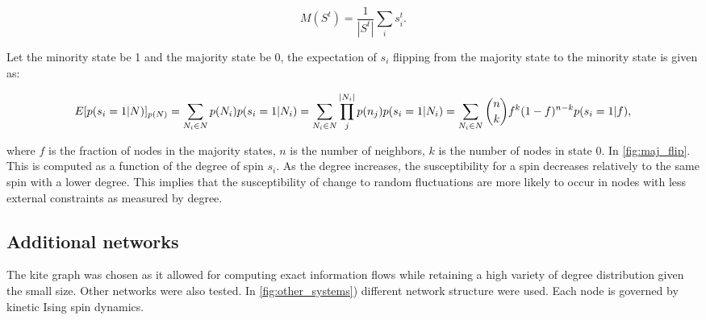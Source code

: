 \documentclass[a4paper, 11pt, twocolumn]{article}
\begin{document}
\[M(S^t) = \frac{1}{|S^t|} \sum_i s_i^t.\]

Let the minority state be 1 and the majority state be 0, the expectation
of \(s_i\) flipping from the majority state to the minority state is
given as:

\begin{dmath}[compact=-1000]
\label{eq:majority_flip}
E[ p(s_i = 1 | N ) ]_{p(N)} = \sum_{N_i \in N} p(N_i) p(s_i = 1 | N_i)\\
            = \sum_{N_i \in  N} \prod_j^{|N_i|} p(n_j) p(s_i  = 1 |N_i)\\
            =  \sum_{N_i \in N}  {n\choose k} f^k  (1  - f)^{n-k}  p(s_i  = 1 | f),
\end{dmath}

where \(f\) is the fraction of nodes in the majority states, \(n\) is
the number of neighbors, \(k\) is the number of nodes in state 0. In
\cref{fig:maj_flip}. This is computed as a function
of the degree of spin \(s_i\). As the degree increases, the
susceptibility for a spin decreases relatively to the same spin with a
lower degree. This implies that the susceptibility of change to random
fluctuations are more likely to occur in nodes with less external
constraints as measured by degree.

\subsection{Additional networks}
\label{additional-networks}
The kite graph was chosen as it allowed for computing exact information
flows while retaining a high variety of degree distribution given the
small size. Other networks were also tested. In
\cref{fig:other_systems}) different network structure
were used. Each node is governed by kinetic Ising spin dynamics.
\end{document}
